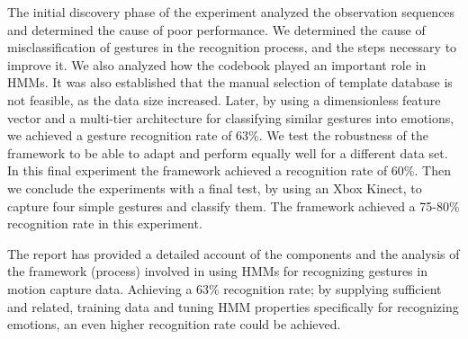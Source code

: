 \documentclass[]{report}   %
\begin{document}
The initial discovery phase of the experiment analyzed the observation sequences and determined the cause of poor performance. We determined the cause of misclassification of gestures in the recognition process, and the steps necessary to improve it. We also analyzed how the codebook played an important role in HMMs. It was also established that the manual selection of template database is not feasible, as the data size increased. Later, by using a dimensionless feature vector and a multi-tier architecture for classifying similar gestures into emotions, we achieved a gesture recognition rate of 63\%. We test the robustness of the framework to be able to adapt and perform equally well for a different data set. In this final experiment the framework achieved a recognition rate of 60\%. Then we conclude the experiments with a final test, by using an Xbox Kinect, to capture four simple gestures and classify them. The framework achieved a 75-80\% recognition rate in this experiment.

The report has provided a detailed account of the components and the analysis of the framework (process) involved in using HMMs for recognizing gestures in motion capture data. Achieving a 63\% recognition rate; by supplying sufficient and related, training data and tuning HMM properties specifically for recognizing emotions, an even higher recognition rate could be achieved.


\nocite{*}

\end{document}
